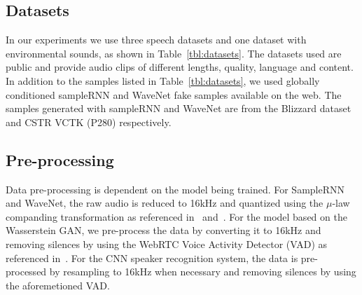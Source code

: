 \subsection{Datasets}
In our experiments we use three speech datasets and one dataset with
environmental sounds, as shown  in Table~\ref{tbl:datasets}. The datasets used
are public and provide audio clips of different lengths, quality, language and
content. In addition to the samples listed in Table~\ref{tbl:datasets}, we used
globally conditioned sampleRNN and WaveNet fake samples available on the web.
The samples generated with sampleRNN and WaveNet are from the Blizzard dataset
and CSTR VCTK (P280) respectively.
\begin{table}[!t]
\bigskip
\caption{Description of the datasets used in our experiments. }
\label{tbl:datasets}
\end{table}

\subsection{Pre-processing}
\label{sub:processdata}
Data pre-processing is dependent on the model being trained. For SampleRNN and
WaveNet, the raw audio is reduced to 16kHz and quantized using the $\mu$-law
companding transformation as referenced in~\cite{mehri2016samplernn}
and~\cite{van2016wavenet}. For the model based on the Wasserstein GAN,
we pre-process the data by converting it to 16kHz and removing silences by using
the WebRTC Voice Activity Detector (VAD) as referenced
in~\cite{zeidan2014webrtc}. For the CNN speaker recognition system, the data is
pre-processed by resampling to 16kHz when necessary and removing silences by
using the aforemetioned VAD. 

